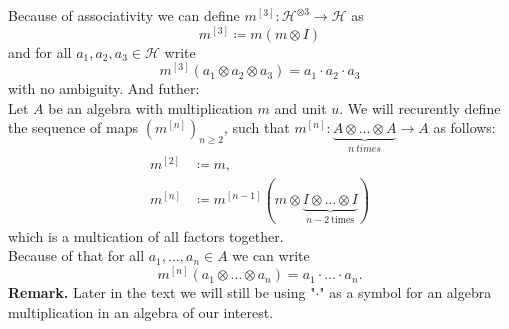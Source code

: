 \documentclass[a4paper]{article}
\begin{document}
\indent  Because of associativity we can define $m^{[3]} : \mathcal{H}^{\otimes 3} \to \mathcal{H}$ as
\begin{equation*}
m^{[3]} \coloneqq m(m\otimes I)
\end{equation*}
and for all $a_1, a_2, a_3 \in \mathcal{H}$ write
\begin{equation*}
m^{[3]}(a_1 \otimes a_2 \otimes a_3) = a_1 \cdot a_2 \cdot a_3
\end{equation*}
with no ambiguity.
And futher: \\
\indent Let $A$ be an algebra with multiplication $m$ and unit $u$. We will recurently define the 
sequence of maps
$(m^{[n]})_{n \geq 2}$, such that $m^{[n]} : \underbrace{A \otimes \dots \otimes A}_{n\ times} \to A$
as follows:
\begin{align*}
m^{[2]} &\coloneqq m, \\
m^{[n]} &\coloneqq m^{[n-1]}(m \otimes \underbrace{I \otimes \dots \otimes I}_{n-2 \mathrm{\ times}})
\end{align*}
which is a multication of all factors together. \\
Because of that for all $a_1, \dots, a_n \in A$ we can write
\begin{equation*}
m^{[n]}(a_1 \otimes \dots \otimes a_n) = a_1 \cdot \ldots \cdot a_n.
\end{equation*}
\indent \textbf{Remark. } Later in the text we will still be using "$\cdot$" as a symbol for an algebra
multiplication in an algebra of our interest.
\end{document}
